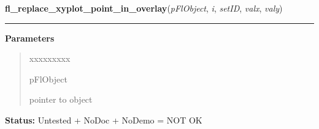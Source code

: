 \hspace{.8\funcindent}\begin{boxedminipage}{\funcwidth}

    \raggedright \textbf{fl\_replace\_xyplot\_point\_in\_overlay}(\textit{pFlObject}, \textit{i}, \textit{setID}, \textit{valx}, \textit{valy})

    \vspace{-1.5ex}

    \rule{\textwidth}{0.5\fboxrule}
\setlength{\parskip}{2ex}
\setlength{\parskip}{1ex}
      \textbf{Parameters}
      \vspace{-1ex}

      \begin{quote}
        \begin{Ventry}{xxxxxxxxx}

          \item[pFlObject]

          pointer to object

        \end{Ventry}

      \end{quote}

\textbf{Status:} Untested + NoDoc + NoDemo = NOT OK



    \end{boxedminipage}

    \label{xformslib:flxyplot:fl_get_xyplot_xmapping}

    \vspace{0.5ex}

